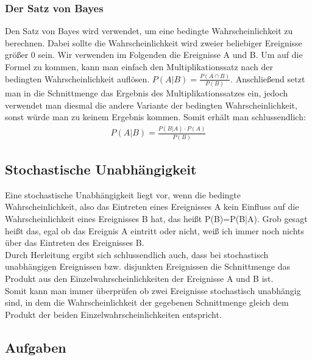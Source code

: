 \documentclass[a4paper]{article}
\begin{document}
\subsubsection{Der Satz von Bayes}
Den Satz von Bayes wird verwendet, um eine bedingte Wahrscheinlichkeit zu berechnen. Dabei sollte die Wahrscheinlichkeit wird zweier beliebiger Ereignisse größer 0 sein. Wir verwenden im Folgenden die Ereignisse A und B. Um auf die Formel zu kommen, kann man einfach den Multiplikationssatz nach der bedingten Wahrscheinlichkeit auflösen. $P(A|B)=\frac{P(A\cap B)}{P(B)}$. Anschließend setzt man in die Schnittmenge das Ergebnis des Multiplikationssatzes ein, jedoch verwendet man diesmal die andere Variante der bedingten Wahrscheinlichkeit, sonst würde man zu keinem Ergebnis kommen. Somit erhält man schlussendlich:
\begin{align*}
    P(A|B) = \frac{P(B|A)\cdot P(A)}{P(B)}
\end{align*}

\subsection{Stochastische Unabhängigkeit}
Eine stochastische Unabhängigkeit liegt vor, wenn die bedingte Wahrscheinlichkeit, also das Eintreten eines Ereignisses A kein Einfluss auf die Wahrscheinlichkeit eines Ereignisses B hat, das heißt P(B)=P(B|A). Grob gesagt heißt das, egal ob das Ereignis A eintritt oder nicht, weiß ich immer noch nichts über das Eintreten des Ereignisses B.\\
Durch Herleitung ergibt sich schlussendlich auch, dass bei stochastisch unabhängigen Ereignissen bzw. disjunkten Ereignissen die Schnittmenge das Produkt aus den Einzelwahrscheinlichkeiten der Ereignisse A und B ist.\\
Somit kann man immer überprüfen ob zwei Ereignisse stochastisch unabhängig sind, in dem die Wahrscheinlichkeit der gegebenen Schnittmenge gleich dem Produkt der beiden Einzelwahrscheinlichkeiten entspricht.

\clearpage
\subsection{Aufgaben}
\end{document}

